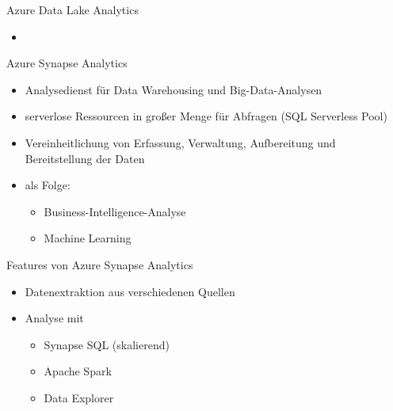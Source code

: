 \begin{flashcard}[Definition]{Azure Data Lake Analytics}
  \begin{itemize}
    \item 
  \end{itemize}
\end{flashcard}

\begin{flashcard}[Definition]{Azure Synapse Analytics}
  \begin{itemize}
    \item Analysedienst für Data Warehousing und Big-Data-Analysen
    \item serverlose Ressourcen in großer Menge für Abfragen (SQL Serverless Pool)
    \item Vereinheitlichung von Erfassung, Verwaltung, Aufbereitung und Bereitstellung der Daten
    \item als Folge:
      \begin{itemize}
        \item Business-Intelligence-Analyse
        \item Machine Learning
      \end{itemize}
  \end{itemize}
\end{flashcard}

\begin{flashcard}[Definition]{Features von Azure Synapse Analytics}
  \begin{itemize}
    \item Datenextraktion aus verschiedenen Quellen
    \item Analyse mit
      \begin{itemize}
        \item Synapse SQL (skalierend)
        \item Apache Spark
        \item Data Explorer
      \end{itemize}

  \end{itemize}
\end{flashcard}
